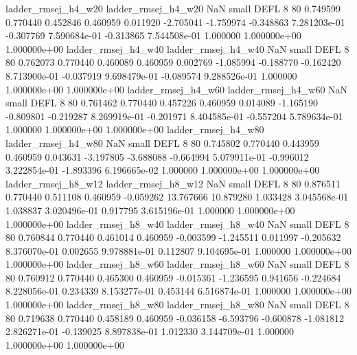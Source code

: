      ladder_rmsej_h4_w20      ladder_rmsej_h4_w20                   NaN      small     DEFL                 8 80 0.749599       0.770440 0.452846       0.460959    0.011920     -2.705041     -1.759974    -0.348863   7.281203e-01 -0.307769 7.590684e-01    -0.313865   7.544508e-01            1.000000    1.000000e+00        1.000000e+00
     ladder_rmsej_h4_w40      ladder_rmsej_h4_w40                   NaN      small     DEFL                 8 80 0.762073       0.770440 0.460089       0.460959    0.002769     -1.085994     -0.188770    -0.162420   8.713900e-01 -0.037919 9.698479e-01    -0.089574   9.288526e-01            1.000000    1.000000e+00        1.000000e+00
     ladder_rmsej_h4_w60      ladder_rmsej_h4_w60                   NaN      small     DEFL                 8 80 0.761462       0.770440 0.457226       0.460959    0.014089     -1.165190     -0.809801    -0.219287   8.269919e-01 -0.201971 8.404585e-01    -0.557204   5.789634e-01            1.000000    1.000000e+00        1.000000e+00
     ladder_rmsej_h4_w80      ladder_rmsej_h4_w80                   NaN      small     DEFL                 8 80 0.745802       0.770440 0.443959       0.460959    0.043631     -3.197805     -3.688088    -0.664994   5.079911e-01 -0.996012 3.222854e-01    -1.893396   6.196665e-02            1.000000    1.000000e+00        1.000000e+00
     ladder_rmsej_h8_w12      ladder_rmsej_h8_w12                   NaN      small     DEFL                 8 80 0.876511       0.770440 0.511108       0.460959   -0.059262     13.767666     10.879280     1.033428   3.045568e-01  1.038837 3.020496e-01     0.917795   3.615196e-01            1.000000    1.000000e+00        1.000000e+00
     ladder_rmsej_h8_w40      ladder_rmsej_h8_w40                   NaN      small     DEFL                 8 80 0.760844       0.770440 0.461014       0.460959   -0.003599     -1.245511      0.011997    -0.205632   8.376070e-01  0.002655 9.978881e-01     0.112807   9.104695e-01            1.000000    1.000000e+00        1.000000e+00
     ladder_rmsej_h8_w60      ladder_rmsej_h8_w60                   NaN      small     DEFL                 8 80 0.760912       0.770440 0.465300       0.460959   -0.015361     -1.236595      0.941656    -0.224684   8.228056e-01  0.234339 8.153277e-01     0.453144   6.516874e-01            1.000000    1.000000e+00        1.000000e+00
     ladder_rmsej_h8_w80      ladder_rmsej_h8_w80                   NaN      small     DEFL                 8 80 0.719638       0.770440 0.458189       0.460959   -0.036158     -6.593796     -0.600878    -1.081812   2.826271e-01 -0.139025 8.897838e-01     1.012330   3.144709e-01            1.000000    1.000000e+00        1.000000e+00

